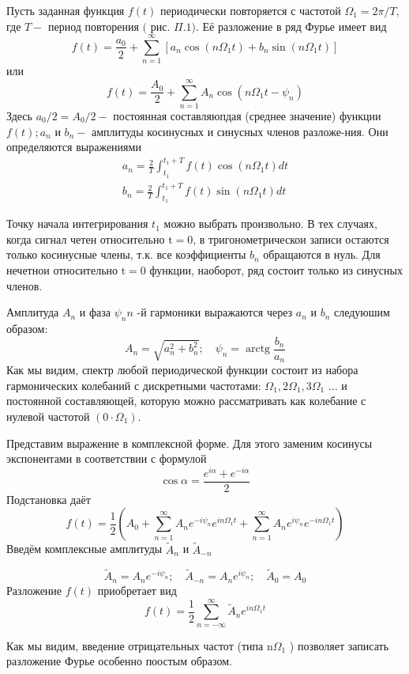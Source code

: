 \documentclass[a4paper, 12pt]{article}%
\begin{document}
Пусть заданная функция $f(t)$ периодически повторяется с частотой $\Omega_{1}=2 \pi / T,$ где $T-$ период повторения $($ рис. $\Pi .1) .$ Её разложение в ряд Фурье имеет вид
$$
f(t)=\frac{a_{0}}{2}+\sum_{n=1}^{\infty}\left[a_{n} \cos \left(n \Omega_{1} t\right)+b_{n} \sin \left(n \Omega_{1} t\right)\right]
$$
или
$$
f(t)=\frac{A_{0}}{2}+\sum_{n=1}^{\infty} A_{n} \cos \left(n \Omega_{1} t-\psi_{n}\right)
$$
Здесь $a_{0} / 2=A_{0} / 2-$ постоянная составляюпдая (среднее значение) функции $f(t) ; a_{n}$ и $b_{n}-$ амплитуды косинусных и синусных членов разложе-ния. Они определяются выражениями
$$
\begin{array}{l}
a_{n}=\frac{2}{T} \int_{t_{1}}^{t_{1}+T} f(t) \cos \left(n \Omega_{1} t\right) d t \\
b_{n}=\frac{2}{T} \int_{t_{1}}^{t_{1}+T} f(t) \sin \left(n \Omega_{1} t\right) d t
\end{array}
$$

Точку начала интегрирования $t_{1}$ можно выбрать произвольно. В тех случаях, когда сигнал четен относительно $\mathrm{t}=0$, в тригонометрическои записи остаются только косинусные члены, т.к. все коэффициенты $b_{n}$ обращаются в нуль. Для нечетнои относительно $\mathrm{t}=0$ функции, наоборот, ряд состоит только из синусных членов.

Амплитуда $A_{n}$ и фаза $\psi_{n} n$ -й гармоники выражаются через $a_{n}$ и $b_{n}$ следуюшим образом:
$$
A_{n}=\sqrt{a_{n}^{2}+b_{n}^{2}} ; \quad \psi_{n}=\operatorname{arctg} \frac{b_{n}}{a_{n}}
$$
Как мы видим, спектр любой периодической функции состоит из набора гармонических колебаний с дискретными частотами: $\Omega_{1}, 2 \Omega_{1}, 3 \Omega_{1}$ $\ldots$ и постоянной составляющей, которую можно рассматривать как колебание с нулевой частотой $\left(0 \cdot \Omega_{1}\right) .$

Представим выражение в комплексной форме. Для этого заменим косинусы экспонентами в соответствии с формулой
$$
\cos \alpha=\frac{e^{i \alpha}+e^{-i \alpha}}{2}
$$
Подстановка даёт
$$
f(t)=\frac{1}{2}\left(A_{0}+\sum_{n=1}^{\infty} A_{n} e^{-i \psi_{n}} e^{i n \Omega_{1} t}+\sum_{n=1}^{\infty} A_{n} e^{i \psi_{n}} e^{-i n \Omega_{1} t}\right)
$$
Введём комплексные амплитуды $\tilde{A}_{n}$ и $\tilde{A}_{-n}$

$$
\tilde{A}_{n}=A_{n} e^{-i \psi_{n}} ; \quad \tilde{A}_{-n}=A_{n} e^{i \psi_{n}} ; \quad \tilde{A}_{0}=A_{0}
$$
Разложение $f(t)$ приобретает вид
$$
f(t)=\frac{1}{2} \sum_{n=-\infty}^{\infty} \tilde{A}_{n} e^{i n \Omega_{1} t}
$$

Как мы видим, введение отрицательных частот (типа $\mathrm{n} \Omega_{1}$ ) позволяет записать разложение Фурье особенно поостым образом.
\end{document}
